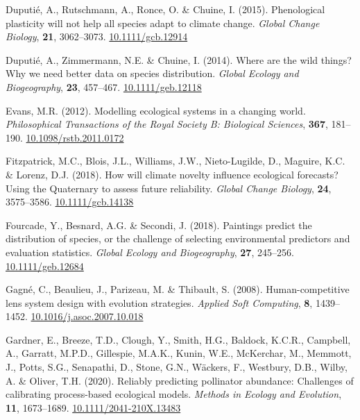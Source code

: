 \documentclass[11pt,]{article}
\newlength{\cslhangindent}
\newenvironment{CSLReferences}[2] %
 {%
  \setlength{\parindent}{0pt}
  \ifodd #1 \everypar{\setlength{\hangindent}{\cslhangindent}}\ignorespaces\fi
  \ifnum #2 > 0
  \setlength{\parskip}{#2\baselineskip}
  \fi
 }%
 {}
\begin{document}
\begin{CSLReferences}{1}{0}
\leavevmode{}%
Duputié, A., Rutschmann, A., Ronce, O. \& Chuine, I. (2015).
Phenological plasticity will not help all species adapt to climate
change. \emph{Global Change Biology}, \textbf{21}, 3062--3073.
\href{https://doi.org/10.1111/gcb.12914}{10.1111/gcb.12914}

\leavevmode{}%
Duputié, A., Zimmermann, N.E. \& Chuine, I. (2014). Where are the wild
things? Why we need better data on species distribution. \emph{Global
Ecology and Biogeography}, \textbf{23}, 457--467.
\href{https://doi.org/10.1111/geb.12118}{10.1111/geb.12118}

\leavevmode{}%
Evans, M.R. (2012). Modelling ecological systems in a changing world.
\emph{Philosophical Transactions of the Royal Society B: Biological
Sciences}, \textbf{367}, 181--190.
\href{https://doi.org/10.1098/rstb.2011.0172}{10.1098/rstb.2011.0172}

\leavevmode{}%
Fitzpatrick, M.C., Blois, J.L., Williams, J.W., Nieto-Lugilde, D.,
Maguire, K.C. \& Lorenz, D.J. (2018). How will climate novelty influence
ecological forecasts? {Using} the {Quaternary} to assess future
reliability. \emph{Global Change Biology}, \textbf{24}, 3575--3586.
\href{https://doi.org/10.1111/gcb.14138}{10.1111/gcb.14138}

\leavevmode{}%
Fourcade, Y., Besnard, A.G. \& Secondi, J. (2018). Paintings predict the
distribution of species, or the challenge of selecting environmental
predictors and evaluation statistics. \emph{Global Ecology and
Biogeography}, \textbf{27}, 245--256.
\href{https://doi.org/10.1111/geb.12684}{10.1111/geb.12684}

\leavevmode{}%
Gagné, C., Beaulieu, J., Parizeau, M. \& Thibault, S. (2008).
Human-competitive lens system design with evolution strategies.
\emph{Applied Soft Computing}, \textbf{8}, 1439--1452.
\href{https://doi.org/10.1016/j.asoc.2007.10.018}{10.1016/j.asoc.2007.10.018}

\leavevmode{}%
Gardner, E., Breeze, T.D., Clough, Y., Smith, H.G., Baldock, K.C.R.,
Campbell, A., Garratt, M.P.D., Gillespie, M.A.K., Kunin, W.E.,
McKerchar, M., Memmott, J., Potts, S.G., Senapathi, D., Stone, G.N.,
Wäckers, F., Westbury, D.B., Wilby, A. \& Oliver, T.H. (2020). Reliably
predicting pollinator abundance: {Challenges} of calibrating
process-based ecological models. \emph{Methods in Ecology and
Evolution}, \textbf{11}, 1673--1689.
\href{https://doi.org/10.1111/2041-210X.13483}{10.1111/2041-210X.13483}


\end{CSLReferences}
\end{document}
